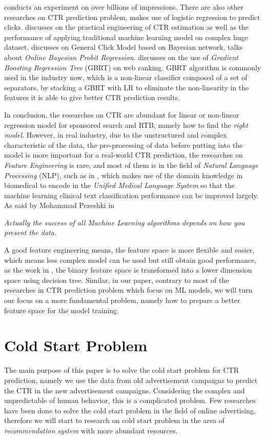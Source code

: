 \cite{cheng2012multimedia} conducts an experiment on over billions of impressions. There are also other researches on CTR prediction problem, \cite{richardson2007predicting} makes use of logistic regression to predict clicks. \cite{mcmahan2013ad} discusses on the practical engineering of CTR estimation as well as the performance of applying traditional machine learning model on complex huge dataset. \cite{zhu2010novel} discusses on General Click Model based on Bayesian network. \cite{graepel2010web} talks about \textit{Online Bayesian Probit Regression}. \cite{mohan2011web} discusses on the use of \textit{Gradient Boosting Regression Tree} (GBRT) on web ranking. GBRT algorithm is commonly used in the industry now, which is a non-linear classifier composed of a set of separators, by stacking a GBRT with LR to eliminate the non-linearity in the features it is able to give better CTR prediction results.

In conclusion, the researches on CTR are abundant for linear or non-linear regression model for sponsored search and RTB, namely how to find the \textit{right model}. However, in real industry, due to the unstructured and complex characteristic of the data, the pre-processing of data before putting into the model is more important for a real-world CTR prediction, the researches on \textit{Feature Engineering} is rare, and most of them is in the field of \textit{Natural Language Processing} (NLP), such as in \cite{garla2012ontology}, which makes use of the domain knowledge in biomedical to encode in the \textit{Unified Medical Language System} so that the machine learning clinical text classification performance can be improved largely. As said by Mohammad Pezeshki in \cite{featureengineering}

\textit{Actually the success of all Machine Learning algorithms depends on how you present the data.}

A good feature engineering means, the feature space is more flexible and easier, which means less complex model can be used but still obtain good performance, as the work in \cite{he2014practical}, the binary feature space is transformed into a lower dimension space using decision tree. Similar, in our paper, contrary to most of the researches in CTR prediction problem which focus on ML models, we will turn our focus on a more fundamental problem, namely how to prepare a better feature space for the model training.   

\section{Cold Start Problem}
The main purpose of this paper is to solve the cold start problem for CTR prediction, namely we use the data from old advertisement campaigns to predict the CTR in the new advertisement campaigns. Considering the complex and unpredictable of human behavior, this is a complicated problem. Few researches have been done to solve the cold start problem in the field of online advertising, therefore we will start to research on cold start problem in the area of \textit{recommendation system} with more abundant resources.

